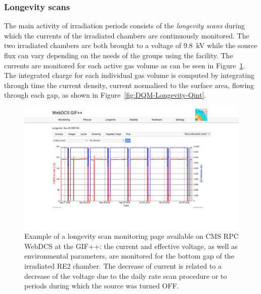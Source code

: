 		\subsubsection{Longevity scans}
		\label{chapt5:sssec:longscan}
	
	The main activity of irradiation periods consists of the \textit{longevity scans} during which the currents of the irradiated chambers are continuously monitored. The two irradiated chambers are both brought to a voltage of \SI{9.8}{kV} while the source flux can vary depending on the needs of the groups using the facility. The currents are monitored for each active gas volume as can be seen in Figure~\ref{fig:DQM-Longevity-Monitoring}. The integrated charge for each individual gas volume is computed by integrating through time the current density, current normalised to the surface area, flowing through each gap, as shown in Figure~\ref{fig:DQM-Longevity-Qint}.
	
\newpage
	
	\begin{figure}[H]
        \centering
		\includegraphics[width = \linewidth]{fig/chapt5/Longevity-scan-I-HVeff-vs-Time.png}
		\caption{\label{fig:DQM-Longevity-Monitoring} Example of a longevity scan monitoring page available on CMS RPC WebDCS at the GIF++: the current and effective voltage, as well as environmental parameters, are monitored for the bottom gap of the irradiated RE2 chamber. The decrease of current is related to a decrease of the voltage due to the daily rate scan procedure or to periods during which the source was turned OFF.}
	\end{figure}
	
